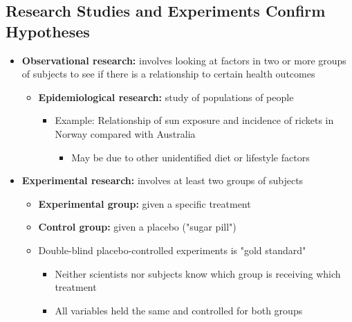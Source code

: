 \documentclass[12pt]{article}
\begin{document}
        \subsection{Research Studies and Experiments Confirm Hypotheses}
            \begin{itemize}
                \item \textbf{Observational research:} involves looking at factors in two or more groups of subjects to see if there is a relationship to certain health outcomes
                    \begin{itemize}
                        \item \textbf{Epidemiological research:} study of populations of people
                            \begin{itemize}
                                \item Example: Relationship of sun exposure and incidence of rickets in Norway compared with Australia
                                    \begin{itemize}
                                        \item May be due to other unidentified diet or lifestyle factors
                                    \end{itemize}
                            \end{itemize}
                    \end{itemize}
                \item \textbf{Experimental research:} involves at least two groups of subjects
                    \begin{itemize}
                        \item \textbf{Experimental group:} given a specific treatment
                        \item \textbf{Control group:} given a placebo ("sugar pill")
                        \item Double-blind placebo-controlled experiments is "gold standard"
                            \begin{itemize}
                                \item Neither scientists nor subjects know which group is receiving which treatment
                                \item All variables held the same and controlled for both groups
                            \end{itemize}
                    \end{itemize}
            \end{itemize}
\end{document}
